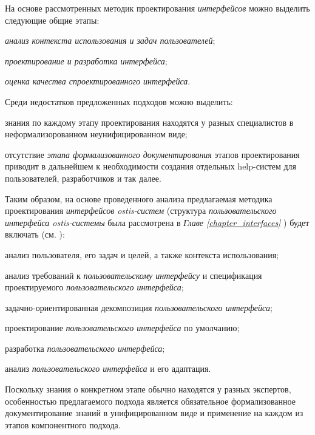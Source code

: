 На основе рассмотренных методик проектирования \textit{интерфейсов} можно выделить следующие общие этапы:
\begin{textitemize}
\item \textit{анализ контекста использования и задач пользователей};
\item \textit{проектирование и разработка \textit{интерфейса}};
\item \textit{оценка качества спроектированного \textit{интерфейса}}.
\end{textitemize}

Среди недостатков предложенных подходов можно выделить:
\begin{textitemize}
	\item знания по каждому этапу проектирования находятся у разных специалистов в неформализорованном неунифицированном виде;
	\item отсутствие \textit{этапа формализованного документирования} этапов проектирования приводит в дальнейшем к необходимости создания отдельных help-систем для пользователей, разработчиков и так далее.
\end{textitemize}

Таким образом, на основе проведенного анализа предлагаемая методика проектирования \textit{интерфейсов ostis-систем} (структура \textit{пользовательского интерфейса ostis-системы} была рассмотрена в \textit{Главе \ref{chapter_interfaces} }) будет включать (см. ):
\begin{textitemize}
\item анализ пользователя, его задач и целей, а также контекста использования;
\item анализ требований к \textit{пользовательскому интерфейсу} и спецификация проектируемого \textit{пользовательского интерфейса};
\item задачно-ориентированная декомпозиция \textit{пользовательского интерфейса};
\item проектирование \textit{пользовательского интерфейса} по умолчанию;
\item разработка \textit{пользовательского интерфейса};
\item анализ \textit{пользовательского интерфейса} и его адаптация.
\end{textitemize}

Поскольку знания о конкретном этапе обычно находятся у разных экспертов, особенностью предлагаемого подхода является обязательное формализованное документирование знаний в унифицированном виде и применение на каждом из этапов компонентного подхода.

